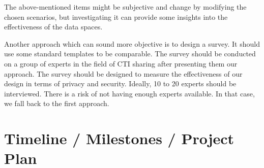\documentclass{article}
\begin{document}
The above-mentioned items might be subjective and change by modifying the chosen scenarios, but investigating it can provide some insights into the effectiveness of the data spaces.

Another approach which can sound more objective is to design a survey. It should use some standard templates to be comparable. The survey should be conducted on a group of experts in the field of CTI sharing after presenting them our approach. The survey should be designed to measure the effectiveness of our design in terms of privacy and security. Ideally, 10 to 20 experts should be interviewed. There is a risk of not having enough experts available. In that case, we fall back to the first approach.


\section{Timeline / Milestones / Project Plan} %

 

\end{document}
